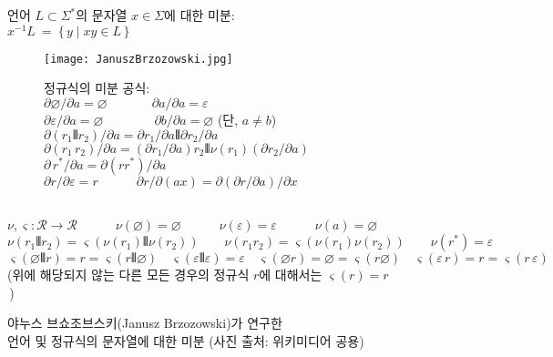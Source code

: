 \begin{figure}\centering
언어 $L\subset\Sigma^{*}$의 문자열 $x\in\Sigma$에 대한 미분:~
$x^{-1} L ~=~ \{\,y \mid xy\in L\,\} \qquad ~~ $\\[1.1ex]
\begin{subfigure}{.2\textwidth}
\texttt{[image: JanuszBrzozowski.jpg]}
\end{subfigure}\qquad\quad
\begin{subfigure}{.65\textwidth}
\!\!정규식의 미분 공식:\\[.7ex]
\( \partial\varnothing\!/\partial a = \varnothing \qquad\quad~\;
   \partial a/\partial a = \varepsilon \) \\[.6ex]
\( \partial\varepsilon/\partial a = \varnothing \qquad\qquad
   \partial b/\partial a = \varnothing \) (단, $a\neq b$)\\[.6ex]
\( \partial(r_1\VERT r_2)\!/\partial a = \partial r_1/\partial a \VERT
                                       \partial r_2/\partial a \)\\[.6ex]
\( \partial(r_1\,r_2)\!/\partial a = (\partial r_1/\partial a)r_2 \VERT
                                 \nu(r_1)(\partial r_2/\partial a) \)\\[.6ex]
\( \partial\,r^{*}\!/\partial a = \partial(rr^{*})\!/\partial a \)\\[.8ex]
\( \partial r/\partial \varepsilon = r \qquad\quad
   \partial r/\partial (ax) = \partial (\partial r/\partial a)/\partial x\)
\end{subfigure}\\[1ex]
\( \nu,\varsigma:\mathcal{R}\to\mathcal{R} \qquad\quad
   \nu(\varnothing) = \varnothing \qquad\quad
   \nu(\varepsilon) = \varepsilon \qquad\quad
   \nu(a) = \varnothing \)\qquad$\phantom{A}$\\[.6ex]
\( \nu(r_1\VERT r_2) = \varsigma(\nu(r_1)\VERT\nu(r_2)) \qquad
   \nu(r_1r_2) = \varsigma(\nu(r_1)\nu(r_2)) \qquad
   \nu(r^{*}) = \varepsilon \)\\[1.2ex]
\( \varsigma(\varnothing\VERT r) = r = \varsigma(r \VERT\varnothing) \quad
   \varsigma(\varepsilon\VERT\varepsilon) = \varepsilon \quad
   \varsigma(\varnothing r) = \varnothing = \varsigma(r \varnothing) \quad
   \varsigma(\varepsilon\,r) = r = \varsigma(r\,\varepsilon) \)\\[.7ex]
(위에 해당되지 않는 다른 모든 경우의 정규식 $r$에 대해서는 $\varsigma(r) = r$\,)
\caption{야누스 브쇼조브스키(Janusz Brzozowski)가 연구한 \\
         언어 및 정규식의 문자열에 대한 미분
         {\scriptsize(사진 출처: 위키미디어 공용)}
         \label{fig:Brzozowski}}
\vspace*{-1ex}
\end{figure}


